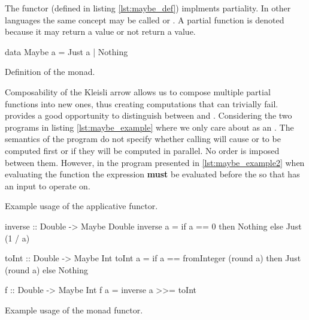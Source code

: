The  functor (defined in listing \ref{lst:maybe_def})
implments partiality. In other languages the same concept may be
called  or . A partial function is denoted
 because it may return a value or not return a
value.

\begin{code}
\begin{haskellcode}
data Maybe a = Just a | Nothing
\end{haskellcode}
  \caption{\label{lst:maybe_def}Definition of the  monad.}
\end{code}

Composability of the Kleisli arrow allows us to compose multiple
partial functions into new ones, thus creating computations that can
trivially fail.  provides a good opportunity to
distinguish between  and . Considering
the two programs in listing \ref{lst:maybe_example} where we only care
about  as an . The semantics of the
program do not specify whether calling  will cause
 or  to be computed first or if they
will be computed in parallel. No order is imposed between
them. However, in the program presented in \ref{lst:maybe_example2}
when evaluating the function  the expression 
\textbf{must} be evaluated before the  so that
 has an input to operate on.

\begin{code}
  \caption{\label{lst:maybe_example}Example usage of the 
    applicative functor.}
\end{code}

\begin{code}
\begin{haskellcode}
inverse :: Double -> Maybe Double
inverse a = if a == 0 then Nothing else Just (1 / a)

toInt :: Double -> Maybe Int
toInt a =
  if a == fromInteger (round a)
    then Just (round a)
    else Nothing

f :: Double -> Maybe Int
f a = inverse a >>= toInt
\end{haskellcode}
\caption{\label{lst:maybe_example2}Example usage of the  monad functor.}
\end{code}

